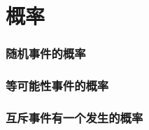 \chapter{概率}
\subsection{随机事件的概率}
\begin{Practice}
  \begin{question}
    \item 
    \item 
  \end{question}
\end{Practice}
\subsection{等可能性事件的概率}
\begin{Practice}
  \begin{question}
    \item 
    \item 
    \item 
  \end{question}
\end{Practice}

\begin{Exercise}
  \begin{question}
    \item 
    \item 
    \item 
    \item 
    \item 
    \item 
    \item 
    \item 
    \item 
    \item 
    \item 
    \item 
    \item 
  \end{question}
\end{Exercise}

\subsection{互斥事件有一个发生的概率}
\begin{Practice}
  \begin{question}
    \item 
    \item 
  \end{question}
\end{Practice}

